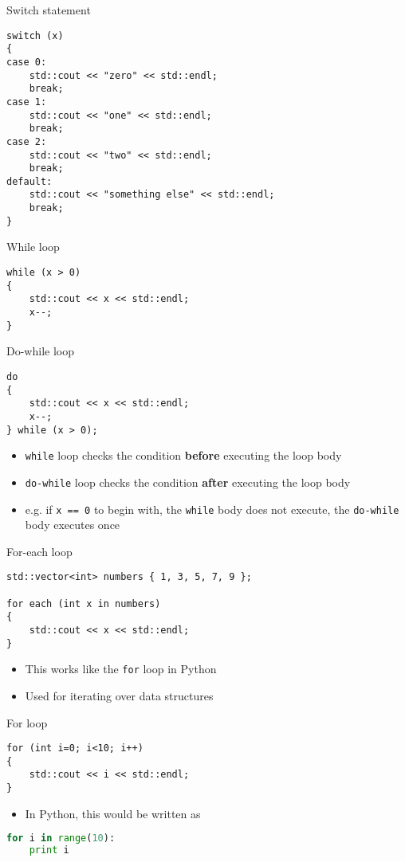\begin{frame}[fragile]{Switch statement}
	\begin{lstlisting}
switch (x)
{
case 0:
    std::cout << "zero" << std::endl;
    break;
case 1:
    std::cout << "one" << std::endl;
    break;
case 2:
    std::cout << "two" << std::endl;
    break;
default:
    std::cout << "something else" << std::endl;
    break;
}
	\end{lstlisting}
\end{frame}

\begin{frame}[fragile]{While loop}
	\begin{lstlisting}
while (x > 0)
{
    std::cout << x << std::endl;
    x--;
}
	\end{lstlisting}
\end{frame}

\begin{frame}[fragile]{Do-while loop}
	\begin{lstlisting}
do
{
    std::cout << x << std::endl;
    x--;
} while (x > 0);
	\end{lstlisting}
	\pause
	\begin{itemize}
		\item \lstinline{while} loop checks the condition \textbf{before} executing the loop body \pause
		\item \lstinline{do-while} loop checks the condition \textbf{after} executing the loop body \pause
		\item e.g. if \lstinline{x == 0} to begin with, the \lstinline{while} body does not execute, the \lstinline{do-while} body executes once
	\end{itemize}
\end{frame}

\begin{frame}[fragile]{For-each loop}
	\begin{lstlisting}
std::vector<int> numbers { 1, 3, 5, 7, 9 };

for each (int x in numbers)
{
    std::cout << x << std::endl;
}
	\end{lstlisting}
    \pause
	\begin{itemize}
		\item This works like the \lstinline{for} loop in Python
		\item Used for iterating over data structures
	\end{itemize}
\end{frame}

\begin{frame}[fragile]{For loop}
	\begin{lstlisting}
for (int i=0; i<10; i++)
{
    std::cout << i << std::endl;
}
	\end{lstlisting}
    \begin{itemize}
        \item In Python, this would be written as
    \end{itemize}
	\begin{lstlisting}[language=Python]
for i in range(10):
    print i
	\end{lstlisting}
\end{frame}

